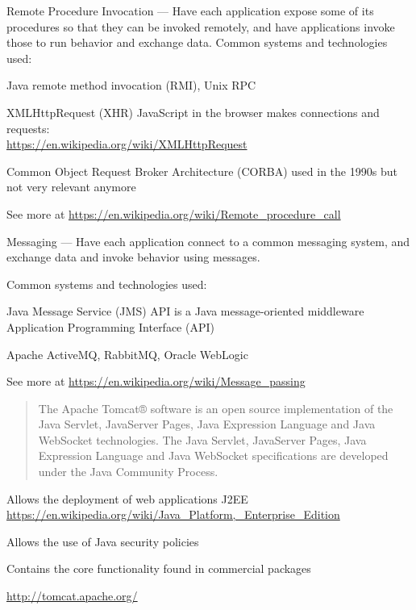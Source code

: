 \documentclass[Screen16to9,17pt]{foils}
\begin{document}


Remote Procedure Invocation — Have each application expose some of its procedures so that they can be invoked remotely, and have applications invoke those to run behavior and exchange data.
Common systems and technologies used:
\begin{list2}
\item Java remote method invocation (RMI), Unix RPC
\item XMLHttpRequest (XHR) JavaScript in the browser makes connections and requests:\\ \url{https://en.wikipedia.org/wiki/XMLHttpRequest}
\item Common Object Request Broker Architecture (CORBA) used in the 1990s but not very relevant anymore
\item See more at \url{https://en.wikipedia.org/wiki/Remote_procedure_call}
\end{list2}



Messaging — Have each application connect to a common messaging system, and exchange data and invoke behavior using messages.

Common systems and technologies used:
\begin{list2}
\item Java Message Service (JMS) API is a Java message-oriented middleware Application Programming Interface (API)
\item Apache ActiveMQ, RabbitMQ, Oracle WebLogic
\item See more at \url{https://en.wikipedia.org/wiki/Message_passing}
\end{list2}






\begin{quote}
The Apache Tomcat® software is an open source implementation of the Java Servlet, JavaServer Pages, Java Expression Language and Java WebSocket technologies. The Java Servlet, JavaServer Pages, Java Expression Language and Java WebSocket specifications are developed under the Java Community Process.
\end{quote}

\begin{list2}
\item Allows the deployment of web applications J2EE\\ \url{https://en.wikipedia.org/wiki/Java_Platform,_Enterprise_Edition}
\item Allows the use of Java security policies
\item Contains the core functionality found in commercial packages
\item \url{http://tomcat.apache.org/}
\end{list2}
\end{document}
